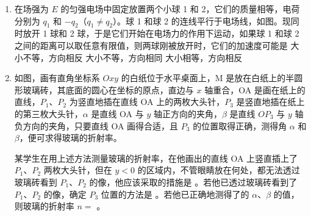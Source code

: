 \documentclass[\gkver]{gaokaozhenti}
\begin{document}
\begin{enumerate}
{
}

\item
在场强为 $E$ 的匀强电场中固定放置两个小球 1 和 2，它们的质量相等，电荷分别为 $q_{1}$ 和 $-q_{2}$（$q_{1}\neq q_{2}$）。球 1 和球 2 的连线平行于电场线，如图。现同时放开 1 球和 2 球，于是它们开始在电场力的作用下运动，如果球 1 和球 2 之间的距离可以取任意有限值，则两球刚被放开时，它们的加速度可能是
\onepicture[w=3.54cm]{}
{大小不等，方向相反}
{大小不等，方向相同}
{大小相等，方向相反}

\item
如图，画有直角坐标系 $Oxy$ 的白纸位于水平桌面上，M 是放在白纸上的半圆形玻璃砖，其底面的圆心在坐标的原点，直边与 $x$ 轴重合，OA 是画在纸上的直线，$P_{1}$、$P_{2}$ 为竖直地插在直线 OA 上的两枚大头针，$P_{3}$ 是竖直地插在纸上的第三枚大头针，$\alpha$ 是直线 OA 与 $y$ 轴正方向的夹角，$\beta$ 是直线 $OP_{3}$ 与 $y$ 轴负方向的夹角，只要直线 OA 画得合适，且 $P_{3}$ 的位置取得正确，测得角 $\alpha$ 和 $\beta$，便可求得玻璃的折射率。

某学生在用上述方法测量玻璃的折射率，在他画出的直线 OA 上竖直插上了 $P_{1}$、$P_{2}$ 两枚大头针，但在 $y<0$ 的区域内，不管眼睛放在何处，都无法透过玻璃砖看到 $P_{1}$、$P_{2}$ 的像，他应该采取的措施是 。若他已透过玻璃砖看到了 $P_{1}$、$P_{2}$ 的像，确定 $P_{3}$ 位置的方法是 。若他已正确地测得了的 $\alpha$、$\beta$ 的值，则玻璃的折射率 $n=$ \tkanswer[3cm]{$\frac{\sin\beta}{\sin\alpha}$}。

\onepicture[align=right, w=3.95cm]{}
\end{enumerate}
\end{document}
